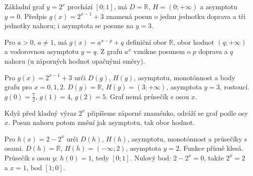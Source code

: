 \documentclass[11pt,a4paper]{article}
\begin{document}
Základní graf $y=2^x$ prochází $[0;1]$, má $D=\mathbb R$, $H=(0;+\infty)$ a asymptotu $y=0$. Předpis $g(x)=2^{x-1}+3$ znamená posun o jednu jednotku doprava a tři jednotky nahoru; i asymptota se posune na $y=3$.
\begin{center}
\end{center}
\begin{zadaniBox}[title={Věta - Posuny exponenciálního grafu}]
Pro $a>0$, $a\ne1$, má $g(x)=a^{x-p}+q$ definiční obor $\mathbb R$, obor hodnot $(q;+\infty)$ a vodorovnou asymptotu $y=q$. Z grafu $a^x$ vznikne posunem o $p$ doprava a $q$ nahoru (u záporných hodnot opačnými směry).
\end{zadaniBox}
\begin{prikladReseniBox}[title={Příklad 1}]
Pro $g(x)=2^{x-1}+3$ urči $D(g)$, $H(g)$, asymptotu, monotónnost a body grafu pro $x=0,1,2$.
\tcblower
$D(g)=\mathbb R$, $H(g)=(3;+\infty)$, asymptota $y=3$, rostoucí. $g(0)=\frac72$, $g(1)=4$, $g(2)=5$. Graf nemá průsečík s osou $x$.
\end{prikladReseniBox}
Když před kladný výraz $2^x$ připíšeme záporné znaménko, odráží se graf podle osy $x$. Posun nahoru potom změní jak asymptotu, tak obor hodnot.
\begin{prikladReseniBox}[title={Příklad 2}]
Pro $h(x)=2-2^x$ urči $D(h)$, $H(h)$, asymptotu, monotónnost a průsečíky s osami.
\tcblower
$D(h)=\mathbb R$, $H(h)=(-\infty;2)$, asymptota $y=2$. Funkce přísně klesá. Průsečík s osou $y$: $h(0)=1$, tedy $[0;1]$. Nulový bod: $2-2^x=0$, takže $2^x=2$ a $x=1$, bod $[1;0]$.
\end{prikladReseniBox}
\end{document}
